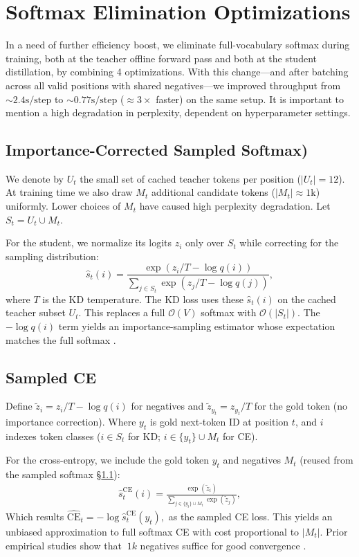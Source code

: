 \documentclass[11pt]{article}
\begin{document}
\section{Softmax Elimination Optimizations}
\label{sec:softmax_elimination}
In a need of further efficiency boost, we eliminate full-vocabulary softmax during training, both at the teacher offline forward pass and both at the student distillation, by combining 4 optimizations.
With this change---and after batching across all valid positions with shared negatives---we improved throughput from ${\sim}2.4\text{s}/\text{step}$ to ${\sim}0.77\text{s}/\text{step}$ ($\approx3\times$ faster) on the same setup.
It is important to mention a high degradation in perplexity, dependent on hyperparameter settings.

\subsection{Importance-Corrected Sampled Softmax)}
\label{sec:sampled_softmax}
We denote by $U_t$ the small set of cached teacher tokens per position ($|U_t|=12$).
At training time we also draw $M_t$ additional candidate tokens ($|M_t| \approx 1\text{k}$) uniformly.
Lower choices of $M_t$ have caused high perplexity degradation.
Let $S_t = U_t \cup M_t$.

For the student, we normalize its logits $z_i$ only over $S_t$ while correcting for the sampling distribution:
\[
	\hat s_t(i) = \frac{\exp(z_i/T - \log q(i))}{\sum_{j \in S_t} \exp(z_j/T - \log q(j))},
\]
where $T$ is the KD temperature.
The KD loss uses these $\hat s_t(i)$ on the cached teacher subset $U_t$. This replaces a full $\mathcal{O}(V)$ softmax with $\mathcal{O}(|S_t|)$.
The $-\log q(i)$ term yields an importance-sampling estimator whose expectation matches the full softmax \citep{jean2015large}.

\subsection{Sampled CE}
Define $\tilde z_i = z_i/T - \log q(i)$ for negatives and $\tilde z_{y_t}=z_{y_t}/T$ for the gold token (no importance correction).
Where $y_t$ is gold next-token ID at position $t$, and $i$ indexes token classes ($i\in S_t$ for KD; $i\in\{y_t\}\cup M_t$ for CE).

For the cross-entropy, we include the gold token $y_t$ and negatives $M_t$ (reused from the sampled softmax \S\ref{sec:sampled_softmax}):
\begin{align*}
	\hat s^{\text{CE}}_t(i) = \frac{\exp(\tilde z_i)}{\sum_{j \in \{y_t\}\cup M_t} \exp(\tilde z_j)},
\end{align*}
Which results
\(
\widehat{\text{CE}}_t = -\log \hat s^{\text{CE}}_t(y_t),
\)
as the sampled CE loss.
This yields an unbiased approximation to full softmax CE with cost proportional to $|M_t|$.
Prior empirical studies show that $~1k$ negatives suffice for good convergence \citep{blanc2018adaptive}.
\end{document}
